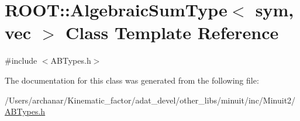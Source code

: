\hypertarget{classROOT_1_1Minuit2_1_1AlgebraicSumType_3_01sym_00_01vec_01_4}{}\section{R\+O\+OT\+:\+:Algebraic\+Sum\+Type$<$ sym, vec $>$ Class Template Reference}
\label{classROOT_1_1Minuit2_1_1AlgebraicSumType_3_01sym_00_01vec_01_4}


{\ttfamily \#include $<$A\+B\+Types.\+h$>$}



The documentation for this class was generated from the following file\+:\begin{DoxyCompactItemize}
\item 
/\+Users/archanar/\+Kinematic\+\_\+factor/adat\+\_\+devel/other\+\_\+libs/minuit/inc/\+Minuit2/\mbox{\hyperlink{other__libs_2minuit_2inc_2Minuit2_2ABTypes_8h}{A\+B\+Types.\+h}}\end{DoxyCompactItemize}
